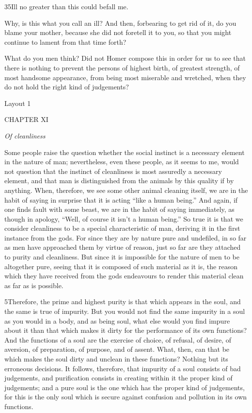 35Ill no greater than this could befall me.

Why, is this what you call an ill? And then, forbearing to get rid of it, do you blame your mother, because she did not foretell it to you, so that you might continue to lament from that time forth?

What do you men think? Did not Homer compose this in order for us to see that there is nothing to prevent the persons of highest birth, of greatest strength, of most handsome appearance, from being most miserable and wretched, when they do not hold the right kind of judgements?



Layout 1

CHAPTER XI

\emph{Of cleanliness}

Some people raise the question whether the social instinct is a necessary element in the nature of man; nevertheless, even these people, as it seems to me, would not question that the instinct of cleanliness is most assuredly a necessary element, and that man is distinguished from the animals by this quality if by anything. When, therefore, we see some other animal cleaning itself, we are in the habit of saying in surprise that it is acting ``like a human being.'' And again, if one finds fault with some beast, we are in the habit of saying immediately, as though in apology, ``Well, of course it isn't a human being.'' So true it is that we consider cleanliness to be a special characteristic of man, deriving it in the first instance from the gods. For since they are by nature pure and undefiled, in so far as men have approached them by virtue of reason, just so far are they attached to purity and cleanliness. But since it is impossible for the nature of men to be altogether pure, seeing that it is composed of such material as it is, the reason which they have received from the gods endeavours to render this material clean as far as is possible.

5Therefore, the prime and highest purity is that which appears in the soul, and the same is true of impurity. But you would not find the same impurity in a soul as you would in a body, and as being soul, what else would you find impure about it than that which makes it dirty for the performance of its own functions? And the functions of a soul are the exercise of choice, of refusal, of desire, of aversion, of preparation, of purpose, and of assent. What, then, can that be which makes the soul dirty and unclean in these functions? Nothing but its erroneous decisions. It follows, therefore, that impurity of a soul consists of bad judgements, and purification consists in creating within it the proper kind of judgements; and a pure soul is the one which has the proper kind of judgements, for this is the only soul which is secure against confusion and pollution in its own functions.

